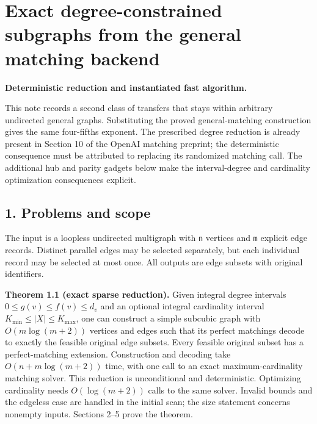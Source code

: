
\hypertarget{af-9f2952a6d0-exact-degree-constrained-subgraphs-from-the-general-matching-backend}{%
\section{Exact degree-constrained subgraphs from the general matching backend}\label{af-9f2952a6d0-exact-degree-constrained-subgraphs-from-the-general-matching-backend}}

\textbf{Deterministic reduction and instantiated fast algorithm.}

This note records a second class of transfers that stays within arbitrary undirected general graphs. Substituting the proved general-matching construction gives the same four-fifths exponent. The prescribed degree reduction is already present in Section 10 of the OpenAI matching preprint; the deterministic consequence must be attributed to replacing its randomized matching call. The additional hub and parity gadgets below make the interval-degree and cardinality optimization consequences explicit.

\hypertarget{af-9f2952a6d0-problems-and-scope}{%
\subsection{1. Problems and scope}\label{af-9f2952a6d0-problems-and-scope}}

The input is a loopless undirected multigraph with \texttt{n} vertices and \texttt{m} explicit edge records. Distinct parallel edges may be selected separately, but each individual record may be selected at most once. All outputs are edge subsets with original identifiers.

\textbf{Theorem 1.1 (exact sparse reduction).} Given integral degree intervals \(0\leq g(v)\leq f(v)\leq d_v\) and an optional integral cardinality interval \(K_{\min}\leq |X|\leq K_{\max}\), one can construct a simple subcubic graph with \(O(m\log(m+2))\) vertices and edges such that its perfect matchings decode to exactly the feasible original edge subsets. Every feasible original subset has a perfect-matching extension. Construction and decoding take \(O(n+m\log(m+2))\) time, with one call to an exact maximum-cardinality matching solver. This reduction is unconditional and deterministic. Optimizing cardinality needs \(O(\log(m+2))\) calls to the same solver. Invalid bounds and the edgeless case are handled in the initial scan; the size statement concerns nonempty inputs. Sections 2--5 prove the theorem.

